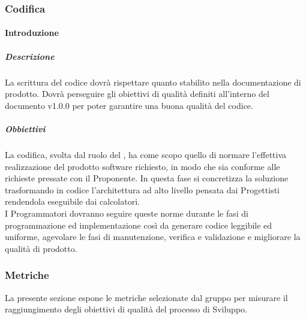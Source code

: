         \subsubsection{Codifica}
            \paragraph{Introduzione}
                \subparagraph{Descrizione}
                    La scrittura del codice dovrà rispettare quanto stabilito nella documentazione di prodotto. Dovrà perseguire gli obiettivi di qualità definiti all'interno del documento  v1.0.0 per poter garantire una buona qualità del codice.\\
                \subparagraph{Obbiettivi}
                    La codifica, svolta dal ruolo del , ha come scopo quello di normare l’effettiva realizzazione del prodotto software richiesto, in modo che sia conforme alle richieste pressate con il Proponente. In questa fase si concretizza la soluzione trasformando in codice l’architettura ad alto livello pensata dai Progettisti rendendola eseguibile dai calcolatori.\\
                    I Programmatori dovranno seguire queste norme durante le fasi di programmazione ed implementazione così da generare codice leggibile ed uniforme, agevolare le fasi di manutenzione, verifica e validazione e migliorare la qualità di prodotto.\\    

        \subsubsection{Metriche}
            La presente sezione espone le metriche selezionate dal gruppo per misurare il raggiungimento degli obiettivi di qualità del processo di Sviluppo. \\
